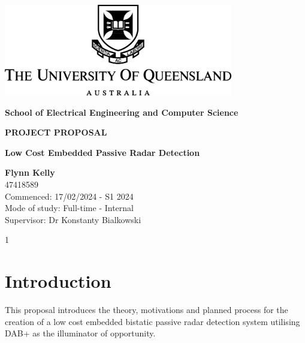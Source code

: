 \documentclass[12pt,a4paper]{article}
\begin{document}
\begin{titlepage}
    \begin{center}
        \vspace*{1cm}

        \includegraphics[width=0.75\textwidth]{UQLogo.jpg}
        
        \vspace{1.5cm}
        
        \textbf{\Large{School of Electrical Engineering and Computer Science}}
        
        \vspace{2.5cm}
        
        \textbf{\Large{PROJECT PROPOSAL}}
        
        \vspace{0.5cm}

        \textbf{\Large{Low Cost Embedded Passive Radar Detection}}
        
        \vspace{2cm}
        
        \textbf{Flynn Kelly}\\
        47418589\\
        
        Commenced: 17/02/2024 - S1 2024\\
        Mode of study: Full-time - Internal\\
        Supervisor: Dr Konstanty Bialkowski
        
        \vfill
        
        \vspace{0.8cm}
        
        \Large{1}
        
    \end{center}
\end{titlepage}

\tableofcontents
\clearpage


\section{Introduction}
This proposal introduces the theory, motivations and planned process for the creation of a low cost embedded bistatic passive radar detection system utilising DAB+ as the illuminator of opportunity. 
\end{document}
